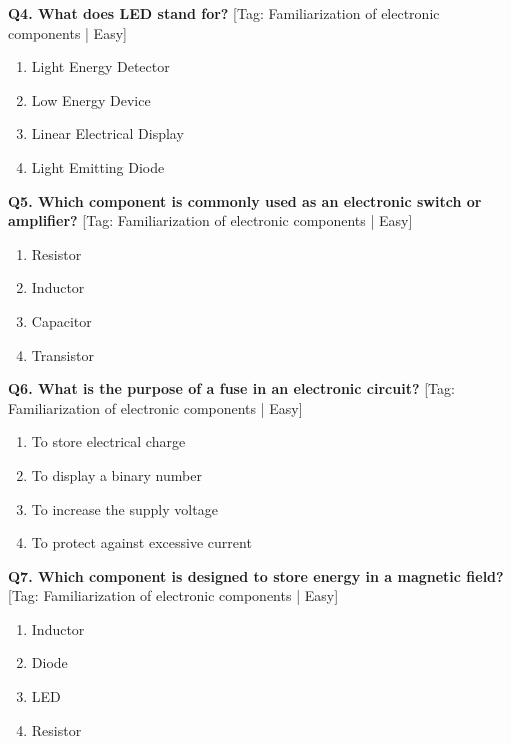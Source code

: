 \noindent\textbf{Q4. What does LED stand for?} \hfill [Tag: Familiarization of electronic components | Easy]
\begin{enumerate}[label=(\alph*),topsep=2pt,itemsep=1pt,partopsep=0pt,parsep=0pt]
    \item {Light Energy Detector}
    \item {Low Energy Device}
    \item {Linear Electrical Display}
    \item {Light Emitting Diode}
\end{enumerate}
\vspace{2mm}

\noindent\textbf{Q5. Which component is commonly used as an electronic switch or amplifier?} \hfill [Tag: Familiarization of electronic components | Easy]
\begin{enumerate}[label=(\alph*),topsep=2pt,itemsep=1pt,partopsep=0pt,parsep=0pt]
    \item {Resistor}
    \item {Inductor}
    \item {Capacitor}
    \item {Transistor}
\end{enumerate}
\vspace{2mm}

\noindent\textbf{Q6. What is the purpose of a fuse in an electronic circuit?} \hfill [Tag: Familiarization of electronic components | Easy]
\begin{enumerate}[label=(\alph*),topsep=2pt,itemsep=1pt,partopsep=0pt,parsep=0pt]
    \item {To store electrical charge}
    \item {To display a binary number}
    \item {To increase the supply voltage}
    \item {To protect against excessive current}
\end{enumerate}
\vspace{2mm}

\noindent\textbf{Q7. Which component is designed to store energy in a magnetic field?} \hfill [Tag: Familiarization of electronic components | Easy]
\begin{enumerate}[label=(\alph*),topsep=2pt,itemsep=1pt,partopsep=0pt,parsep=0pt]
    \item {Inductor}
    \item {Diode}
    \item {LED}
    \item {Resistor}
\end{enumerate}
\vspace{2mm}

